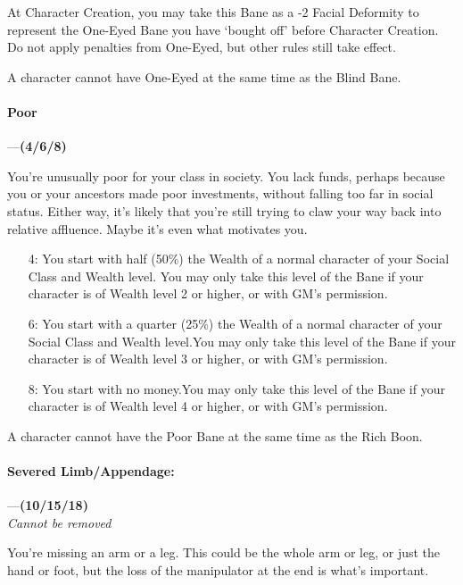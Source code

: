 \documentclass[oneside,11pt,english]{book}
\begin{document}
At Character Creation, you may take this Bane as a -2 Facial Deformity to represent the One-Eyed Bane you have ‘bought off’ before Character Creation. Do not apply penalties from One-Eyed, but other rules still take effect.


A character cannot have One-Eyed at the same time as the Blind Bane.
\paragraph{\label{bane:Poor}Poor}---\quad\textbf{(4/6/8) }\par
You're unusually poor for your class in society. You lack funds, perhaps because you or your ancestors made poor investments, without falling too far in social status. Either way, it's likely that you're still trying to claw your way back into relative affluence. Maybe it's even what motivates you.

\begin{itemize}
	\item [4:] You start with half (50\%) the Wealth of a normal character of your Social Class and Wealth level. You may only take this level of the Bane if your character is of Wealth level 2 or higher, or with GM's permission.
	\item [6:] You start with a quarter (25\%) the Wealth of a normal character of your Social Class and Wealth level.You may only take this level of the Bane if your character is of Wealth level 3 or higher, or with GM's permission.
	\item [8:] You start with no money.You may only take this level of the Bane if your character is of Wealth level 4 or higher, or with GM's permission.
\end{itemize}
A character cannot have the Poor Bane at the same time as the Rich Boon.
\paragraph{\label{bane:Severed Limb/Appendage}Severed Limb/Appendage:}---\quad\textbf{(10/15/18) }\\
\emph{Cannot be removed}\par
You're missing an arm or a leg. This could be the whole arm or leg, or just the hand or foot, but the loss of the manipulator at the end is what's important.
\end{document}
